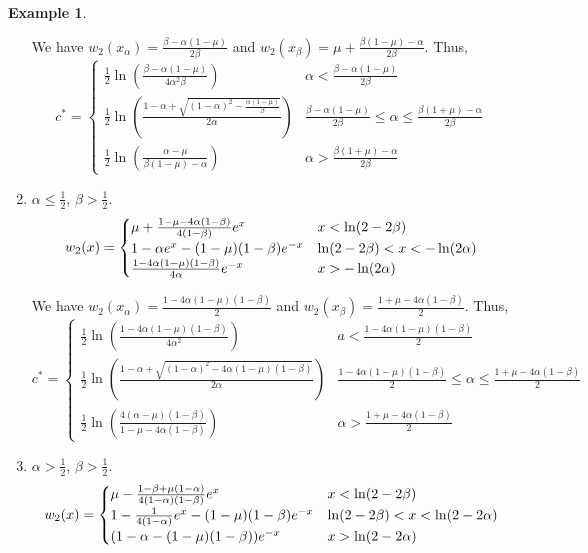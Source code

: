 \documentclass[11pt]{article}
\theoremstyle{definition}
\newtheorem{ex}[thm]{Example}
\numberwithin{equation}{section}
\numberwithin{thm}{section}
\renewcommand{\a}{\alpha}
\renewcommand{\b}{\beta}
\newcommand{\m}{\mu}
\begin{document}
\begin{ex}
\begin{enumerate}[{Case} 1.]
We have $w_2(x_\a)=\frac{\b-\a(1-\m)}{2\b}$ and $w_2(x_\b)=\m + \frac{\b(1-\m)-\a}{2\b}$. Thus,
\begin{equation}
c^* = \begin{cases}
\frac{1}{2} \ln \left( \frac{\b-\a(1-\m)}{4\a^2\b} \right) & \a < \frac{\b-\a(1-\m)}{2\b} \\
\frac{1}{2} \ln \left( \frac{1-\a + \sqrt{(1-\a)^2 - \frac{\a(1-\m)}{\b}}}{2\a} \right) & \frac{\b-\a(1-\m)}{2\b} \leq \a \leq \frac{\b(1+\m)-\a}{2\b} \\
\frac{1}{2} \ln \left( \frac{\a-\m}{\b(1-\m)-\a}\right) & \a > \frac{\b(1+\m)-\a}{2\b}
\end{cases}
\end{equation}


\item $\a\leq\frac{1}{2}$, $\b>\frac{1}{2}$.
\begin{equation}
w_2(x) = \begin{cases}
\m + \Conecasetwo e^x  & x < \ln(2-2\b) \\
1 - \Ctwocaseone e^x - \Cthreecasetwo e^{-x} & \ln(2-2\b) < x < -\ln(2\a) \\
\Cfourcasetwo e^{-x} & x > -\ln(2\a)
\end{cases}
\end{equation}

We have $w_2(x_\a)=\frac{1-4\a(1-\m)(1-\b)}{2}$ and $w_2(x_\b)=\frac{1+\m-4\a(1-\b)}{2}$. Thus,
\begin{equation}
c^* = \begin{cases}
\frac{1}{2} \ln \left( \frac{1-4\a(1-\m)(1-\b)}{4\a^2} \right) & a<\frac{1-4\a(1-\m)(1-\b)}{2} \\
\frac{1}{2} \ln \left( \frac{1-\a + \sqrt{(1-\a)^2 - 4\a(1-\m)(1-\b)}}{2\a} \right) & \frac{1-4\a(1-\m)(1-\b)}{2}\leq\a\leq\frac{1+\m-4\a(1-\b)}{2} \\
\frac{1}{2} \ln \left( \frac{4(\a-\m)(1-\b)}{1-\m-4\a(1-\b)}\right) & \a>\frac{1+\m-4\a(1-\b)}{2}
\end{cases}
\end{equation}


\item $\a>\frac{1}{2}$, $\b>\frac{1}{2}$.
\begin{equation}
w_2(x) = \begin{cases}
\m \Conecasethree e^x  & x < \ln(2-2\b) \\
1 - \Ctwocasetwo e^x - \Cthreecasetwo e^{-x} & \ln(2-2\b) < x < \ln(2-2\a) \\
(\Cfourcasethree) e^{-x} & x > \ln(2-2\a)
\end{cases}
\end{equation}


\end{enumerate}
\end{ex}
\end{document}
